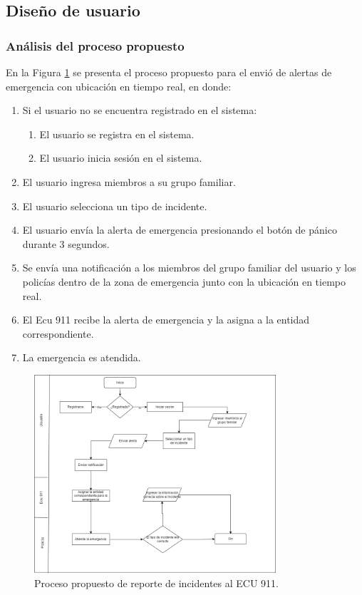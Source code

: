 \subsection{Diseño de usuario}

\subsubsection{Análisis del proceso propuesto}

En la Figura \ref{fig:proceso-propuesto} se presenta el proceso propuesto para el envió de alertas de emergencia con
ubicación en tiempo real, en donde:

\begin{enumerate}
    \item Si el usuario no se encuentra registrado en el sistema:
          \begin{enumerate}
              \item El usuario se registra en el sistema.
              \item El usuario inicia sesión en el sistema.
          \end{enumerate}
    \item El usuario ingresa miembros a su grupo familiar.
    \item El usuario selecciona un tipo de incidente.
    \item El usuario envía la alerta de emergencia presionando el botón de pánico durante 3 segundos.
    \item Se envía una notificación a los miembros del grupo familiar del usuario y los policías dentro de la zona de emergencia junto con la ubicación en tiempo real.
    \item El Ecu 911 recibe la alerta de emergencia y la asigna a la entidad correspondiente.
    \item La emergencia es atendida.
\end{enumerate}

\begin{figure}[H]
    \centering
    \includegraphics[width=0.8\textwidth]{chapters/III-resultados-y-discusion/resources/images/proceso-propuesto.png}
    \caption{Proceso propuesto de reporte de incidentes al ECU 911.}
    \label{fig:proceso-propuesto}
\end{figure}

